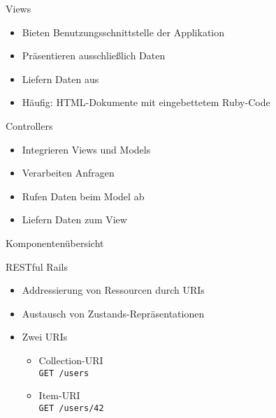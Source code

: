 \begin{frame}{Views}
  \begin{itemize}
    \item Bieten Benutzungsschnittstelle der Applikation
    \item Präsentieren ausschließlich Daten
    \item Liefern Daten aus
    \item Häufig: HTML-Dokumente mit eingebettetem Ruby-Code
  \end{itemize}
\end{frame}

\begin{frame}{Controllers}
  \begin{itemize}
    \item Integrieren Views und Models
    \item Verarbeiten Anfragen
    \item Rufen Daten beim Model ab
    \item Liefern Daten zum View
  \end{itemize}
\end{frame}

\begin{frame}{Komponentenübersicht}
  \begin{center}
    
  \end{center}
\end{frame}

\begin{frame}{RESTful Rails}
  \begin{itemize}
    \item Addressierung von Ressourcen durch URIs
    \item Austausch von Zustands-Repräsentationen
    \item Zwei URIs
    \begin{itemize}
      \item Collection-URI \\ \lstinline|GET /users|
      \item Item-URI \\ \lstinline|GET /users/42|
    \end{itemize}
  \end{itemize}
\end{frame}

